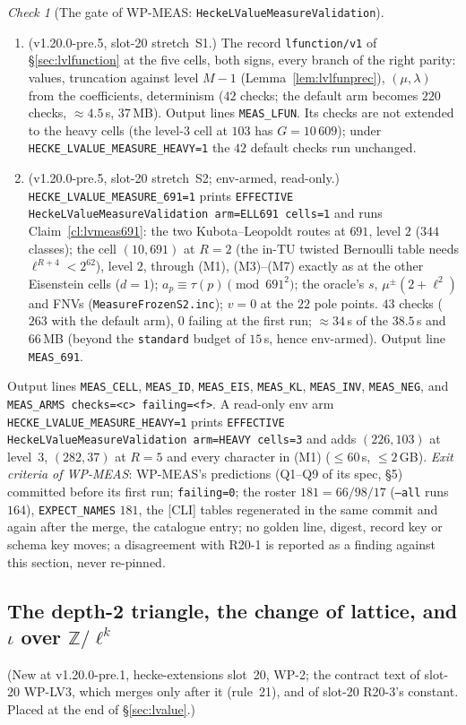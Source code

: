 \documentclass[11pt]{article}
\theoremstyle{remark}
\newtheorem{checkitem}[theorem]{Check}
\newcommand{\Z}{\mathbb{Z}}
\begin{document}
\begin{checkitem}[The gate of WP-MEAS: \texttt{HeckeLValueMeasureValidation}]
\begin{enumerate}
\item[(M7)] (v1.20.0-pre.5, slot-20 stretch~S1.) The record \texttt{lfunction/v1} of \S\ref{sec:lvlfunction} at the five cells, both signs, every branch of the right parity: values, truncation
  against level $M-1$ (Lemma~\ref{lem:lvlfunprec}), $(\mu,\lambda)$ from the coefficients, determinism ($42$ checks; the default arm becomes $220$ checks, $\approx4.5$\,s, $37$\,MB). Output
  lines \texttt{MEAS\_LFUN}. Its checks are not extended to the heavy cells (the level-$3$ cell at $103$ has $G=10\,609$); under
  \texttt{HECKE\_LVALUE\_MEASURE\_HEAVY=1} the $42$ default checks run unchanged.
\item[(M691)] (v1.20.0-pre.5, slot-20 stretch~S2; env-armed, read-only.) \texttt{HECKE\_LVALUE\_MEASURE\_691=1} prints \texttt{EFFECTIVE HeckeLValueMeasureValidation arm=ELL691 cells=1} and runs
  Claim~\ref{cl:lvmeas691}: the two Kubota--Leopoldt routes at $691$, level $2$ ($344$ classes); the cell $(10,691)$ at $R=2$ (the in-TU twisted Bernoulli table needs $\ell^{R+4}<2^{62}$), level $2$,
  through (M1), (M3)--(M7) exactly as at the other Eisenstein cells ($d=1$); $a_p\equiv\tau(p)\pmod{691^{2}}$; the oracle's $s$, $\mu^{\pm}(2+\ell^{2})$ and FNVs (\texttt{MeasureFrozenS2.inc});
  $v=0$ at the $22$ pole points. $43$ checks ($263$ with the default arm), $0$ failing at the first run; $\approx34$\,s of the $38.5$\,s and $66$\,MB (beyond the \texttt{standard} budget of $15$\,s, hence
  env-armed). Output line \texttt{MEAS\_691}.
\end{enumerate}
Output lines \texttt{MEAS\_CELL}, \texttt{MEAS\_ID}, \texttt{MEAS\_EIS}, \texttt{MEAS\_KL}, \texttt{MEAS\_INV}, \texttt{MEAS\_NEG}, and \texttt{MEAS\_ARMS checks=<c> failing=<f>}. A read-only env arm
\texttt{HECKE\_LVALUE\_MEASURE\_HEAVY=1} prints \texttt{EFFECTIVE HeckeLValueMeasureValidation arm=HEAVY cells=3} and adds $(226,103)$ at level~$3$, $(282,37)$ at $R=5$ and every
character in (M1) ($\le60$\,s, $\le2$\,GB). \emph{Exit criteria of WP-MEAS}: WP-MEAS's predictions (Q1--Q9 of its spec, \S5) committed before its first run; \texttt{failing=0}; the
roster $181=66/98/17$ (\texttt{--all} runs $164$), \texttt{EXPECT\_NAMES} $181$, the [CLI] tables regenerated in the same commit and again after the merge, the catalogue entry; no golden
line, digest, record key or schema key moves; a disagreement with R20-1 is reported as a finding against this section, never re-pinned.
\end{checkitem}

\subsection{The depth-2 triangle, the change of lattice, and \texorpdfstring{$\iota$}{iota} over \texorpdfstring{$\Z/\ell^{k}$}{Z/l\^{}k}}\label{sec:lvdepth2}
(New at v1.20.0-pre.1, hecke-extensions slot~20, WP-2; the contract text of slot-20 WP-LV3, which merges only after it (rule~21), and of slot-20 R20-3's constant. Placed
at the end of \S\ref{sec:lvalue}.)
\end{document}

